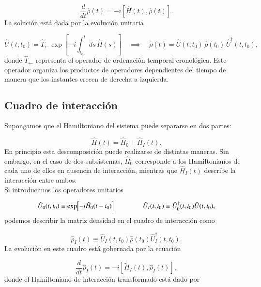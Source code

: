 \begin{equation*}
    \frac{d}{dt}\hat{\rho}(t) = -i[\hat{H}(t),\hat{\rho}(t)].
\end{equation*}
La solución está dada por la evolución unitaria

\begin{equation*}
    \hat{U}(t,t_{0}) = \hat{T}_{\leftarrow} \exp \left[ -i \int_{t_{0}}^{t} ds\, \hat{H}(s) \right] 
    \quad \implies \quad 
    \hat{\rho}(t) = \hat{U}(t,t_{0})\,\hat{\rho}(t_{0})\,\hat{U}^{\dagger}(t,t_{0}),
\end{equation*}
donde $\hat{T}_{\leftarrow}$ representa el operador de ordenación temporal cronológica. Este operador organiza los productos de operadores dependientes del tiempo de manera que los instantes crecen de derecha a izquierda.

\subsection{Cuadro de interacción}
Supongamos que el Hamiltoniano del sistema puede separarse en dos partes:

\begin{equation*}
    \hat{H}(t) = \hat{H}_{0} + \hat{H}_{I}(t).
\end{equation*}
En principio esta descomposición puede realizarse de distintas maneras. Sin embargo, en el caso de dos subsistemas, $\hat{H}_{0}$ corresponde a los Hamiltonianos de cada uno de ellos en ausencia de interacción, mientras que $\hat{H}_{I}(t)$ describe la interacción entre ambos.  \\

Si introducimos los operadores unitarios

\begin{equation*}
    \hat{U}_{0}(t,t_{0}) \equiv \exp[-i\hat{H}_{0}(t-t_{0})] 
    \hspace{15mm} 
    \hat{U}_{I}(t,t_0) \equiv \hat{U}^{\dagger}_{0}(t,t_{0})\hat{U}(t,t_{0}),
\end{equation*}
podemos describir la matriz densidad en el cuadro de interacción como

\begin{equation*}
    \hat{\rho}_{I}(t) \equiv \hat{U}_{I}(t,t_{0})\hat{\rho}(t_{0})\hat{U}^{\dagger}_{I}(t,t_{0}).
\end{equation*}
La evolución en este cuadro está gobernada por la ecuación

\begin{equation}
    \frac{d}{dt}\hat{\rho}_{I}(t) = -i[\tilde{H}_{I}(t), \hat{\rho}_{I}(t)],
    \label{sec11:interactionp}
\end{equation}
donde el Hamiltoniano de interacción transformado está dado por

